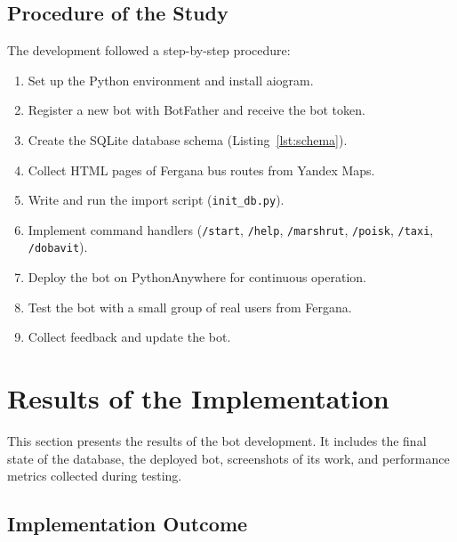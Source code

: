 \subsection{Procedure of the Study}
\label{subsec:procedure}

The development followed a step-by-step procedure:

\begin{enumerate}
    \item Set up the Python environment and install aiogram.
    \item Register a new bot with BotFather and receive the bot token.
    \item Create the SQLite database schema (Listing~\ref{lst:schema}).
    \item Collect HTML pages of Fergana bus routes from Yandex Maps.
    \item Write and run the import script (\texttt{init\_db.py}).
    \item Implement command handlers (\texttt{/start}, \texttt{/help},
        \texttt{/marshrut}, \texttt{/poisk}, \texttt{/taxi},
        \texttt{/dobavit}).
    \item Deploy the bot on PythonAnywhere for continuous operation.
    \item Test the bot with a small group of real users from Fergana.
    \item Collect feedback and update the bot.
\end{enumerate}


\section{Results of the Implementation}
\label{sec:results}

This section presents the results of the bot development. It includes the
final state of the database, the deployed bot, screenshots of its work, and
performance metrics collected during testing.

\subsection{Implementation Outcome}
\label{subsec:outcome}

